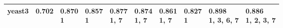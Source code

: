 \begin{tabular}{llllllllll}
yeast3                 &  \makecell{0.702 \\ \scriptsize{}} &                 \makecell{0.870 \\ \scriptsize{1}} &           \makecell{0.857 \\ \scriptsize{1}} &     \makecell{0.877 \\ \scriptsize{1, 7}} &     \makecell{0.874 \\ \scriptsize{1, 7}} &  \makecell{0.861 \\ \scriptsize{1, 7}} &                    \makecell{0.827 \\ \scriptsize{1}} &              \makecell{0.898 \\ \scriptsize{1, 3, 6, 7}} &  \makecell{0.886 \\ \scriptsize{1, 2, 3, 7}} \\
\bottomrule
\end{tabular}
